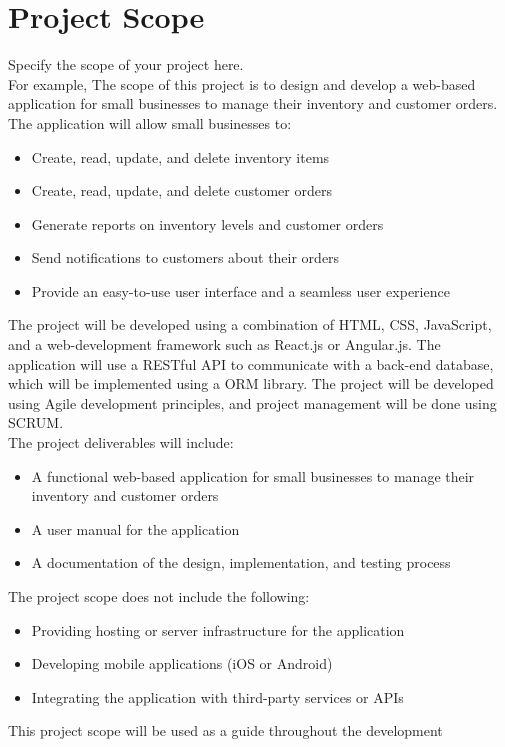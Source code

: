 \documentclass{FastFyp}
\begin{document}
\section{Project Scope}
Specify the scope of your project here.\\
For example, The scope of this project is to design and develop a web-based application for small businesses to manage their inventory and customer orders. The application will allow small businesses to:
\begin{itemize}
    \item Create, read, update, and delete inventory items
   \item Create, read, update, and delete customer orders
   \item Generate reports on inventory levels and customer orders
   \item Send notifications to customers about their orders
   \item Provide an easy-to-use user interface and a seamless user experience
\end{itemize}
The project will be developed using a combination of HTML, CSS, JavaScript, and a web-development framework such as React.js or Angular.js. The application will use a RESTful API to communicate with a back-end database, which will be implemented using a ORM library. The project will be developed using Agile development principles, and project management will be done using SCRUM.\\
The project deliverables will include:
\begin{itemize}
 \item A functional web-based application for small businesses to manage their inventory and customer orders
 \item A user manual for the application
 \item A documentation of the design, implementation, and testing process
 \end{itemize}
The project scope does not include the following:
\begin{itemize}
 \item  Providing hosting or server infrastructure for the application
 \item Developing mobile applications (iOS or Android)
 \item  Integrating the application with third-party services or APIs
 \end{itemize}
This project scope will be used as a guide throughout the development
\end{document}
